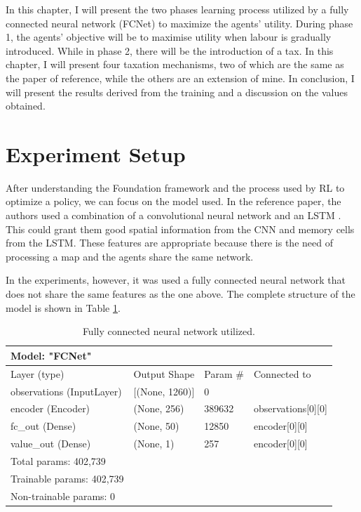 In this chapter, I will present the two phases learning process utilized by a fully connected neural network (FCNet) to maximize the agents' utility. During phase 1, the agents' objective will be to maximise utility when labour is gradually introduced. While in phase 2, there will be the introduction of a tax. In this chapter, I will present four taxation mechanisms, two of which are the same as the paper of reference, while the others are an extension of mine. In conclusion, I will present the results derived from the training and a discussion on the values obtained.

\section{Experiment Setup}

After understanding the Foundation framework and the process used by RL to optimize a policy, we can focus on the model used. In the reference paper, the authors used a combination of a convolutional neural network and an LSTM \cite{zheng2020ai}. This could grant them good spatial information from the CNN and memory cells from the LSTM. These features are appropriate because there is the need of processing a map and the agents share the same network.

In the experiments, however, it was used a fully connected neural network that does not share the same features as the one above. The complete structure of the model is shown in Table \ref{tab:Fcnet}. 


\begin{table}[h!]
    \begin{tabular}{llll}
	Model: "FCNet"            &                    &          &                            \\ \hline
	Layer (type)              & Output Shape       & Param \# & Connected to               \\ \hline
	observations (InputLayer) & {[}(None, 1260){]} & 0        &                            \\ \hline
	encoder (Encoder)         & (None, 256)        & 389632   & observations{[}0{]}{[}0{]} \\ \hline
	fc\_out (Dense)           & (None, 50)         & 12850    & encoder{[}0{]}{[}0{]}      \\ \hline
	value\_out (Dense)        & (None, 1)          & 257      & encoder{[}0{]}{[}0{]}      \\ \hline
	Total params: 402,739     &                    &          &                            \\
	Trainable params: 402,739 &                    &          &                            \\
	Non-trainable params: 0   &                    &          &                            \\ \hline
    \end{tabular}
    \caption{\label{tab:Fcnet} Fully connected neural network utilized.}
\end{table}

